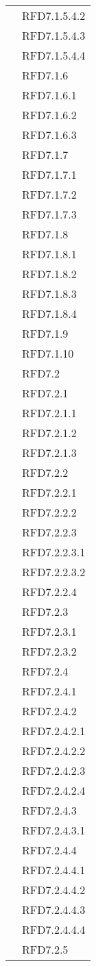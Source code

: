 \begin{longtable}{|>{\centering}m{10cm}|m{3cm}<{\centering}|}
& RFD7.1.5.4.2\\
& RFD7.1.5.4.3\\
& RFD7.1.5.4.4\\
& RFD7.1.6\\
& RFD7.1.6.1\\
& RFD7.1.6.2\\
& RFD7.1.6.3\\
& RFD7.1.7\\
& RFD7.1.7.1\\
& RFD7.1.7.2\\
& RFD7.1.7.3\\
& RFD7.1.8\\
& RFD7.1.8.1\\
& RFD7.1.8.2\\
& RFD7.1.8.3\\
& RFD7.1.8.4\\
& RFD7.1.9\\
& RFD7.1.10\\
& RFD7.2\\
& RFD7.2.1\\
& RFD7.2.1.1\\
& RFD7.2.1.2\\
& RFD7.2.1.3\\
& RFD7.2.2\\
& RFD7.2.2.1\\
& RFD7.2.2.2\\
& RFD7.2.2.3\\
& RFD7.2.2.3.1\\
& RFD7.2.2.3.2\\
& RFD7.2.2.4\\
& RFD7.2.3\\
& RFD7.2.3.1\\
& RFD7.2.3.2\\
& RFD7.2.4\\
& RFD7.2.4.1\\
& RFD7.2.4.2\\
& RFD7.2.4.2.1\\
& RFD7.2.4.2.2\\
& RFD7.2.4.2.3\\
& RFD7.2.4.2.4\\
& RFD7.2.4.3\\
& RFD7.2.4.3.1\\
& RFD7.2.4.4\\
& RFD7.2.4.4.1\\
& RFD7.2.4.4.2\\
& RFD7.2.4.4.3\\
& RFD7.2.4.4.4\\
& RFD7.2.5\\

\end{longtable}
